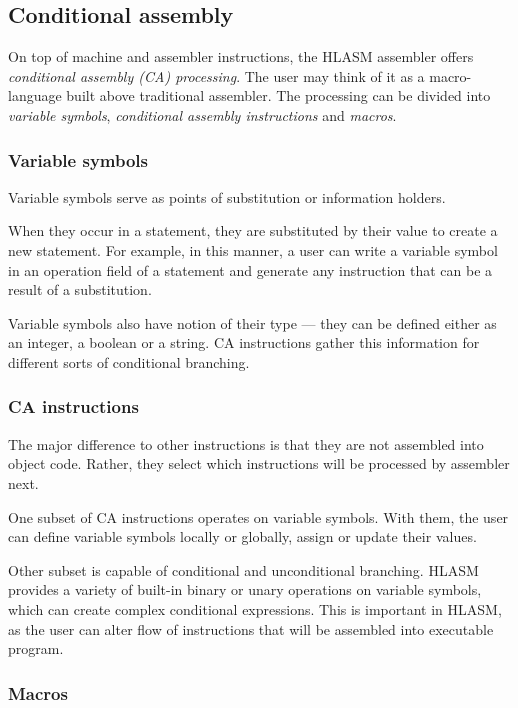 \subsection{Conditional assembly}
\label{CA_proc}

On top of machine and assembler instructions, the HLASM assembler offers \emph{conditional assembly (CA) processing}. The user may think of it as a macro-language built above traditional assembler.
The processing can be divided into \emph{variable symbols}, \emph{conditional assembly instructions} and \emph{macros}. 

\subsubsection{Variable symbols}

Variable symbols serve as points of substitution or information holders. 

When they occur in a statement, they are substituted by their value to create a new statement. For example, in this manner, a user can write a variable symbol in an operation field of a statement and generate any instruction that can be a result of a substitution.

Variable symbols also have notion of their type --- they can be defined either as an integer, a boolean or a string. CA instructions gather this information for different sorts of conditional branching.

\subsubsection{CA instructions}

The major difference to other instructions is that they are not assembled into object code. Rather, they select which instructions will be processed by assembler next.

One subset of CA instructions operates on variable symbols. With them, the user can define variable symbols locally or globally, assign or update their values.

Other subset is capable of conditional and unconditional branching. HLASM provides a variety of built-in binary or unary operations on variable symbols, which can create complex conditional expressions. This is important in HLASM, as the user can alter flow of instructions that will be assembled into executable program.

\subsubsection{Macros}

